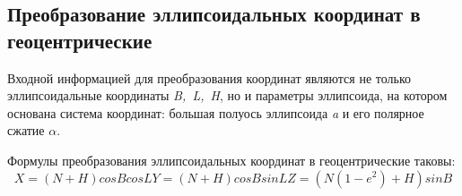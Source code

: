 \documentclass[12pt]{report}
\begin{document}
\subsection*{Преобразование эллипсоидальных координат в геоцентрические}
Входной информацией для преобразования координат являются не только эллипсоидальные координаты \textit{B,~L,~H}, но и параметры эллипсоида, на котором основана система координат: большая полуось эллипсоида \textit{a} и его полярное сжатие \textit{$\alpha$}.
\par
Формулы преобразования эллипсоидальных координат в геоцентрические таковы:
\begin{equation}
X = (N + H)cosB cosL

Y = (N+H)cosB sinL

Z = (N(1-e^2)+H)sinB
\end{equation}
\end{document}
